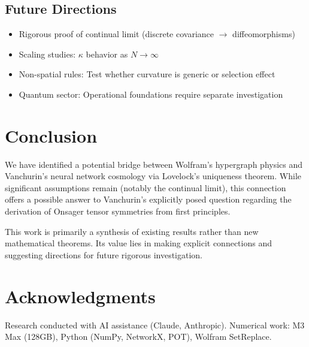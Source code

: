 \documentclass[11pt]{article}
\begin{document}
\subsection{Future Directions}

\begin{itemize}
\item Rigorous proof of continual limit (discrete covariance $\to$ diffeomorphisms)
\item Scaling studies: $\kappa$ behavior as $N \to \infty$
\item Non-spatial rules: Test whether curvature is generic or selection effect
\item Quantum sector: Operational foundations require separate investigation
\end{itemize}

\section{Conclusion}

We have identified a potential bridge between Wolfram's hypergraph physics and Vanchurin's neural network cosmology via Lovelock's uniqueness theorem. While significant assumptions remain (notably the continual limit), this connection offers a possible answer to Vanchurin's explicitly posed question regarding the derivation of Onsager tensor symmetries from first principles.

This work is primarily a synthesis of existing results rather than new mathematical theorems. Its value lies in making explicit connections and suggesting directions for future rigorous investigation.

\section*{Acknowledgments}

Research conducted with AI assistance (Claude, Anthropic). Numerical work: M3 Max (128GB), Python (NumPy, NetworkX, POT), Wolfram SetReplace.
\end{document}
